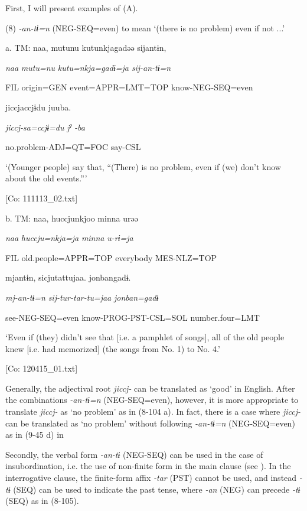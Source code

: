 First, I will present examples of (A).

(8)  \textit{{}-an-tɨ=n} (NEG-SEQ=even) to mean ‘(there is no problem) even if not ...’

  a.  TM:  naa,  mutunu  kutunkjagadəə  sijantɨn,

      \textit{naa}  \textit{mutu=nu}  \textit{kutu=nkja=gadɨ=ja}  \textit{sij-an-tɨ=n}

      FIL  origin=GEN  event=APPR=LMT=TOP  know-NEG-SEQ=even

      jiccjaccjɨdu  juuba.

      \textit{jiccj-sa=ccjɨ=du}  \textit{jˀ} \textit{-ba}

      no.problem-ADJ=QT=FOC  say-CSL

      ‘(Younger people) say that, “(There) is no problem, even if (we) don’t know about the old events.”’

      [Co: 111113\_02.txt]

  b.  TM:  naa,  huccjunkjoo  minna  urəə

      \textit{naa}  \textit{huccju=nkja=ja}  \textit{minna}  \textit{u-rɨ=ja}

      FIL  old.people=APPR=TOP  everybody  MES-NLZ=TOP

      mjantɨn,  sicjutattujaa.  {\textbar}jonban{\textbar}gadɨ.

      \textit{mj-an-tɨ=n}  \textit{sij-tur-tar-tu=jaa}  \textit{jonban=gadɨ}

      see-NEG-SEQ=even  know-PROG-PST-CSL=SOL  number.four=LMT

      ‘Even if (they) didn’t see that [i.e. a pamphlet of songs], all of the old people knew [i.e. had memorized] (the songs from No. 1) to No. 4.’

      [Co: 120415\_01.txt]

Generally, the adjectival root \textit{jiccj-} can be translated as ‘good’ in English. After the combinations \textit{{}-an-tɨ=n} (NEG-SEQ=even), however, it is more appropriate to translate \textit{jiccj-} as ‘no problem’ as in (8-104 a). In fact, there is a case where \textit{jiccj-} can be translated as ‘no problem’ without following \textit{{}-an-tɨ=n} (NEG-SEQ=even) as in (9-45 d) in 

  Secondly, the verbal form \textit{{}-an-tɨ} (NEG-SEQ) can be used in the case of insubordination, i.e. the use of non-finite form in the main clause (see ). In the interrogative clause, the finite-form affix \textit{{}-tar} (PST) cannot be used, and instead \textit{{}-tɨ} (SEQ) can be used to indicate the past tense, where \textit{{}-an} (NEG) can precede \textit{{}-tɨ} (SEQ) as in (8-105).

